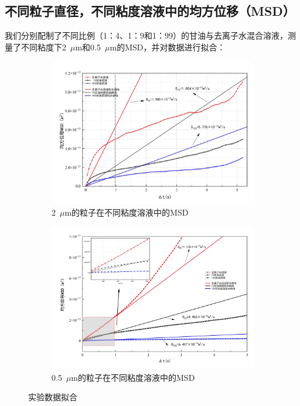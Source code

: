 \documentclass[a4paper]{report} %
\begin{document}
\subsection{不同粒子直径，不同粘度溶液中的均方位移（MSD）}
我们分别配制了不同比例（1：4、1：9和1：99）的甘油与去离子水混合溶液，测量了不同粘度下2~$\mu$m和0.5~$\mu$m的MSD，并对数据进行拟合：\par
\begin{figure}[H]
    \centering
    \begin{subfigure}{0.45\textwidth}
        \includegraphics[width=\linewidth]{实验数据拟合2.jpg}
        \caption{2~$\mu$m的粒子在不同粘度溶液中的MSD}
        \label{fig:fit2}
    \end{subfigure}
    \begin{subfigure}{0.45\textwidth}
        \includegraphics[width=\linewidth]{实验数据拟合3.jpg}
        \caption{0.5~$\mu$m的粒子在不同粘度溶液中的MSD}
        \label{fig:fit3}
    \end{subfigure}

    \caption{实验数据拟合}
\end{figure}
\end{document}
